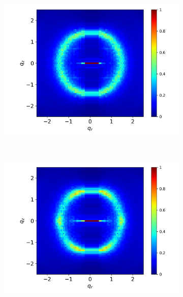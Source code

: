 \documentclass{article}
\begin{document}
\begin{figure}[!hbt]
\begin{subfigure}{0.45\linewidth}
                \caption{}~\label{fig:p2p_disordered}
        \end{subfigure}
        \begin{subfigure}{0.45\linewidth}
                \centering
                \includegraphics[width=\linewidth]{offset_disordered_rzplot.png}
                \caption{}~\label{fig:offset_disordered_xrd}
        \end{subfigure}%
        \begin{subfigure}{0.45\linewidth}
                \centering
                \includegraphics[width=\linewidth]{layered_disordered_rzplot.png}
                \caption{}~\label{fig:layered_disordered_xrd}
        \end{subfigure}

\end{figure}
\end{document}
